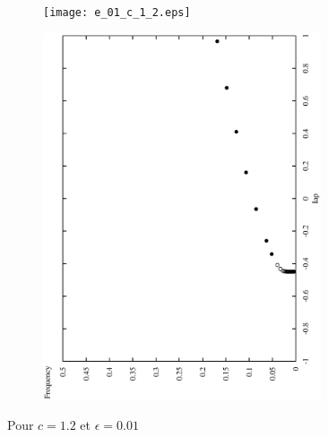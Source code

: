 \documentclass[12pt,a4paper,onecolumn]{article}
\begin{document}
\begin{figure}[htb]\ContinuedFloat
	\centering
	\begin{subfigure}[b]{\textwidth}
		\texttt{[image: e\_01\_c\_1\_2.eps]}
	\end{subfigure}

	\begin{subfigure}[b]{\textwidth}
		\includegraphics[angle = 270, width = 0.9\textwidth]{freq_c_1_2.eps}
	\end{subfigure}
	\caption{Pour $c = 1.2$ et $\epsilon = 0.01$}
\end{figure}
\end{document}
